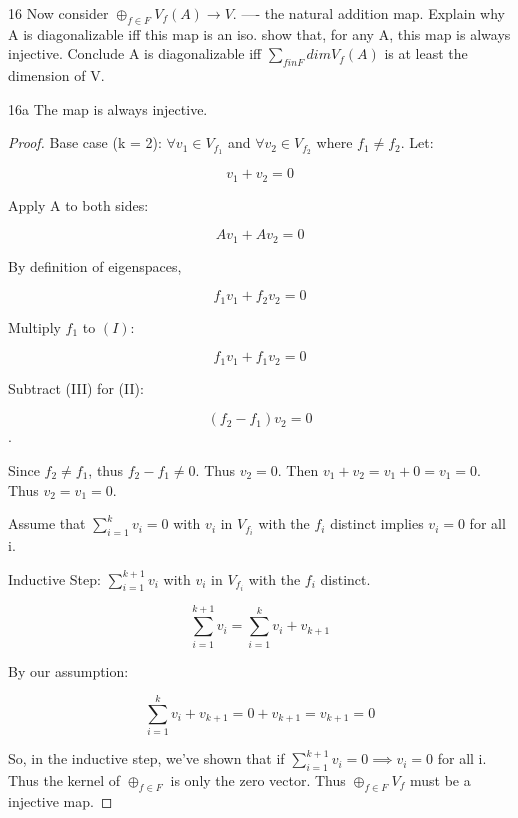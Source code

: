 \documentclass{article}
\begin{document}
\begin{PROB}{16}\label{Problem 16.}
    Now consider $\oplus_{f \in F} V_f(A) \to V$.  —- the natural addition map. Explain why A is diagonalizable iff this map is an iso.  show that, for any A, this map is always injective. Conclude A is diagonalizable iff  $\sum_{f in F} dim V_f(A)$ is at least the dimension of V. 
\end{PROB}
\begin{claim}{16a}\label{Claim 16a.}
    The map is always injective.
\end{claim}
\begin{proof}
    Base case (k = 2): $\forall v_1 \in V_{f_1}$ and $\forall v_2 \in V_{f_2}$ where $f_1 \neq f_2$. 
    Let: 
    
    \begin{equation}{}
        v_1 + v_2 = 0
    \end{equation}

    Apply A to both sides:

    $$Av_1 + Av_2 = 0$$

    By definition of eigenspaces,

    \begin{equation}{}
        f_1v_1 + f_2v_2 = 0
    \end{equation}

    Multiply $f_1$ to $(I)$:

    \begin{equation}{}
        f_1v_1 + f_1v_2 = 0
    \end{equation}

    Subtract (III) for (II):

    \begin{equation}{}
        (f_2 - f_1)v_2 = 0
    \end{equation}.

    Since $f_2 \neq f_1$, thus $f_2 - f_1 \neq 0$. Thus $v_2 = 0$. Then $v_1 + v_2 = v_1 + 0 = v_1 = 0$. Thus $v_2 = v_1 = 0$.

    Assume that $\sum_{i=1}^{k}v_i = 0$ with $v_i$ in $V_{f_i}$ with the $f_i$ distinct implies $v_i = 0$ for all i.

    Inductive Step: $\sum_{i=1}^{k + 1}v_i$ with $v_i$ in $V_{f_i}$ with the $f_i$ distinct.

    $$\sum_{i=1}^{k + 1}v_i = \sum_{i=1}^{k}v_i + v_{k+1}$$

    By our assumption:

    $$\sum_{i=1}^{k}v_i + v_{k+1} = 0 + v_{k+1} = v_{k+1} = 0$$

    So, in the inductive step, we've shown that if $\sum_{i=1}^{k + 1}v_i = 0 \implies v_i = 0$ for all i. Thus the kernel of $\oplus_{ f \in F}$ is only the zero vector. Thus $\oplus_{ f \in F} V_f$ must be a injective map.
\end{proof}
\end{document}
